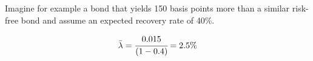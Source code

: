 Imagine for example a bond that yields 150 basis points more than a similar risk-free bond and assume an expected recovery rate of 40\%.

\begin{equation*}
\bar{\lambda} = \cfrac{0.015}{(1-0.4)} = 2.5\%
\end{equation*}











